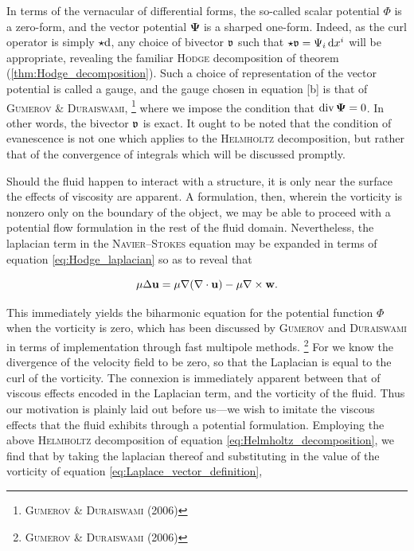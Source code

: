 In terms of the vernacular of differential forms, the so-called scalar potential $\Phi$ is a zero-form, and the vector potential $\mathbf{\Psi}$ is a sharped one-form.
Indeed, as the curl operator is simply $\star\mathrm{d}$, any choice of bivector $\mathfrak{v}$ such that $\star\mathfrak{v} = \Psi_i\,\mathrm{d} x^i$ will be appropriate, revealing the familiar \textsc{Hodge} decomposition of theorem (\ref{thm:Hodge_decomposition}).
Such a choice of representation of the vector potential is called a gauge, and the gauge chosen in equation \subeqref{\ref{eq:Helmholtz_decomposition}}[b] is that of \textsc{Gumerov} \& \textsc{Duraiswami},%
\footnote{%
        \cite{gumerov2006fast} \textsc{Gumerov} \& \textsc{Duraiswami} (2006)
}
where we impose the condition that $\operatorname{div}\mathbf{\Psi} = 0$.
In other words, the bivector $\mathfrak{v}$ is exact.
It ought to be noted that the condition of evanescence is not one which applies to the \textsc{Helmholtz} decomposition, but rather that of the convergence of integrals which will be discussed promptly.

Should the fluid happen to interact with a structure, it is only near the surface the effects of viscosity are apparent.
A formulation, then, wherein the vorticity is nonzero only on the boundary of the object, we may be able to proceed with a potential flow formulation in the rest of the fluid domain.
Nevertheless, the laplacian term in the \textsc{Navier}--\textsc{Stokes} equation may be expanded in terms of equation \eqref{eq:Hodge_laplacian} so as to reveal that

\begin{equation}\label{eq:Laplace_vector_definition}
  \mu\Delta \mathbf{u} = \mu\nabla(\nabla \cdot \mathbf{u}) - \mu \nabla \times \mathbf{w}.
\end{equation}

\noindent
This immediately yields the biharmonic equation for the potential function $\Phi$ when the vorticity is zero, which has been discussed by \textsc{Gumerov} and \textsc{Duraiswami} in terms of implementation through fast multipole methods.%
\footnote{
  \cite{gumerov2006fast} \textsc{Gumerov} \& \textsc{Duraiswami} (2006)
}
For we know the divergence of the velocity field to be zero, so that the Laplacian is equal to the curl of the vorticity.
The connexion is immediately apparent between that of viscous effects encoded in the Laplacian term, and the vorticity of the fluid.
Thus our motivation is plainly laid out before us---we wish to imitate the viscous effects that the fluid exhibits through a potential formulation.
Employing the above \textsc{Helmholtz} decomposition of equation \eqref{eq:Helmholtz_decomposition}, we find that by taking the laplacian thereof and substituting in the value of the vorticity of equation \eqref{eq:Laplace_vector_definition},

